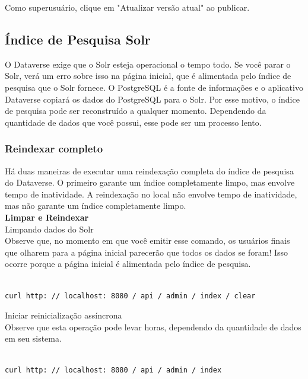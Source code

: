 \documentclass[12pt,hidelinks]{article}
\begin{document}
Como superusuário, clique em "Atualizar versão atual" ao publicar.

\subsection{Índice de Pesquisa Solr}

\qquad O Dataverse exige que o Solr esteja operacional o tempo todo. Se você parar o Solr, verá um erro sobre isso na página inicial, que é alimentada pelo índice de pesquisa que o Solr fornece. O PostgreSQL é a fonte de informações e o aplicativo Dataverse copiará os dados do PostgreSQL para o Solr. Por esse motivo, o índice de pesquisa pode ser reconstruído a qualquer momento. Dependendo da quantidade de dados que você possui, esse pode ser um processo lento.

\subsubsection{Reindexar completo}

\qquad Há duas maneiras de executar uma reindexação completa do índice de pesquisa do Dataverse. O primeiro garante um índice completamente limpo, mas envolve tempo de inatividade. A reindexação no local não envolve tempo de inatividade, mas não garante um índice completamente limpo.\\

\textbf{Limpar e Reindexar}\\

Limpando dados do Solr\\

Observe que, no momento em que você emitir esse comando, os usuários finais que olharem para a página inicial parecerão que todos os dados se foram! Isso ocorre porque a página inicial é alimentada pelo índice de pesquisa.

\begin{verbatim}

curl http: // localhost: 8080 / api / admin / index / clear

\end{verbatim}

Iniciar reinicialização assíncrona\\

Observe que esta operação pode levar horas, dependendo da quantidade de dados em seu sistema.

\begin{verbatim}

curl http: // localhost: 8080 / api / admin / index

\end{verbatim}
\end{document}
